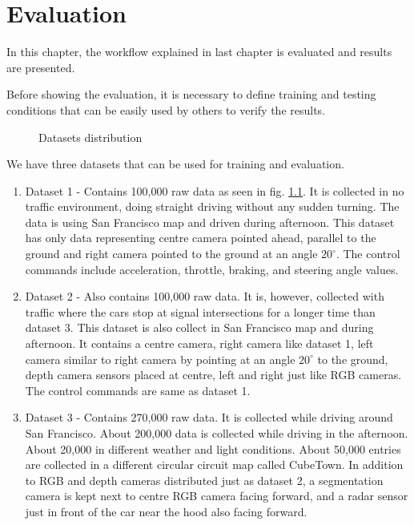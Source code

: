 \chapter{Evaluation}
In this chapter, the workflow explained in last chapter is evaluated and results are
presented.

Before showing the evaluation, it is necessary to define training and testing conditions
that can be easily used by others to verify the results.
\begin{figure}[h]
    \centering
    \def\svgwidth{0.3\textwidth}
    
    \caption{Datasets distribution}
    \label{fig:datasetsdistribution}
\end{figure}

We have three datasets that can be used for training and evaluation.
\begin{enumerate}
    \item Dataset 1 - Contains 100,000 raw data as seen in fig. \ref{fig:datasetsdistribution}. It is collected in no traffic
        environment, doing straight driving without any sudden turning. The data is using
        San Francisco map and driven during afternoon. This dataset has only data
        representing centre camera pointed ahead, parallel to the ground and right camera
        pointed to the ground at an angle $20^{\circ}$. The control commands include
        acceleration, throttle, braking, and steering angle values. \label{chapter05list:ds1}
    \item Dataset 2 - Also contains 100,000 raw data. It is, however, collected with traffic
        where the cars stop at signal intersections for a longer time than dataset 3. This
        dataset is also collect in San Francisco map and during afternoon. It contains a
        centre camera, right camera like dataset 1, left camera similar to right camera by
        pointing at an angle $20^{\circ}$ to the ground, depth camera sensors placed at
        centre, left and right just like RGB cameras. The control commands are same as
        dataset 1.
    \item Dataset 3 - Contains 270,000 raw data. It is collected while driving around San
        Francisco. About 200,000 data is collected while driving in the afternoon. About
        20,000 in different weather and light conditions. About 50,000 entries are
        collected in a different circular circuit map called CubeTown. In addition to RGB
        and depth cameras distributed just as dataset 2, a segmentation camera is kept
        next to centre RGB camera facing forward, and a radar sensor just in front of the
        car near the hood also facing forward.

\end{enumerate}

